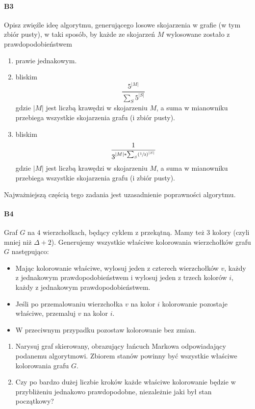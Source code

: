 \paragraph{B3} Opisz zwięźle ideę algorytmu, generującego losowe skojarzenia w grafie (w tym zbiór pusty), w taki sposób, by każde ze skojarzeń $M$ wylosowane zostało z prawdopodobieństwem
\begin{enumerate}[label=\alph*)]
\item prawie jednakowym.
\item  bliskim
$$\frac{5^{|M|}}{\sum _S 5^{|S|}}$$
gdzie $|M|$ jest liczbą krawędzi w skojarzeniu $M$, a suma w mianowniku przebiega wszystkie skojarzenia
grafu (i zbiór pusty).
\item bliskim 
$$\frac{1}{3^{|M|*\sum _S\left(\sfrac{1}{3}\right)^{|S|}}}$$
gdzie $|M|$ jest liczbą krawędzi w skojarzeniu $M$, a suma w mianowniku przebiega wszystkie skojarzenia
grafu (i zbiór pusty). 
\end{enumerate}
Najważniejszą częścią tego zadania jest uzasadnienie poprawności algorytmu.

\paragraph{B4} Graf $G$ na $4$ wierzchołkach, będący cyklem z przekątną. Mamy też 3 kolory (czyli mniej niż $\Delta + 2$). Generujemy wszystkie właściwe kolorowania wierzchołków grafu $G$ następująco:
\begin{itemize}
\item Mając kolorowanie właściwe, wylosuj jeden z czterech wierzchołków $v$, każdy z jednakowym prawdopodobieństwem i wylosuj jeden z trzech kolorów $i$, każdy z jednakowym prawdopodobieństwem.
\item Jeśli po przemalowaniu wierzchołka $v$ na kolor $i$ kolorowanie pozostaje właściwe, przemaluj $v$ na kolor $i$.
\item W przeciwnym przypadku pozostaw kolorowanie bez zmian.
\end{itemize}
\begin{enumerate}[label=\alph*)]
\item Narysuj graf skierowany, obrazujący łańcuch Markowa odpowiadający podanemu algorytmowi. Zbiorem
stanów powinny być wszystkie właściwe kolorowania grafu $G$.
\item Czy po bardzo dużej liczbie kroków każde właściwe kolorowanie będzie w przybliżeniu jednakowo prawdopodobne, niezależnie jaki był stan początkowy?
\end{enumerate}


